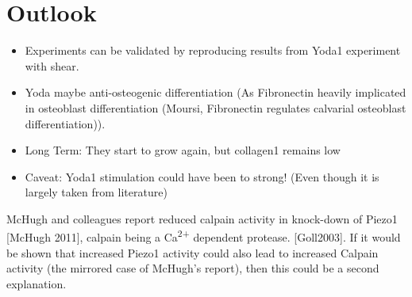 \chapter{Outlook}

\begin{itemize}
    \item Experiments can be validated by reproducing results from Yoda1 experiment with shear.
    \item Yoda maybe anti-osteogenic differentiation (As Fibronectin heavily implicated in osteoblast differentiation (Moursi, Fibronectin regulates calvarial osteoblast differentiation)).
    \item Long Term: They start to grow again, but collagen1 remains low
    \item Caveat: Yoda1 stimulation could have been to strong! (Even though it is largely taken from literature)
\end{itemize}

McHugh and colleagues report reduced calpain activity in knock-down of Piezo1 [McHugh 2011], calpain being a Ca\textsuperscript{2+} dependent protease. [Goll2003]. If it would be shown that increased Piezo1 activity could also lead to increased Calpain activity (the mirrored case of McHugh's report), then this could be a second explanation.